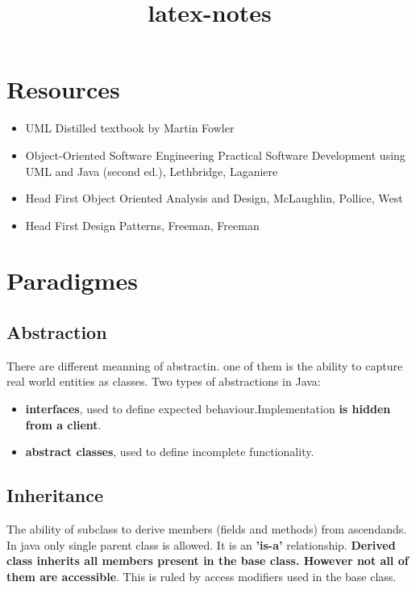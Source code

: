 \documentclass{report}
\title{latex-notes}
\begin{document}
\tableofcontents





\part{Resources}

\begin{itemize}
	\item UML Distilled textbook by Martin Fowler 
	\item Object-Oriented Software Engineering Practical Software Development
	using UML and Java (second ed.), Lethbridge, Laganiere
	\item Head First Object Oriented Analysis and Design, McLaughlin, Pollice, West
	\item Head First Design Patterns, Freeman, Freeman 
\end{itemize}




\part{Paradigmes}



\chapter{Abstraction}
There are different meanning of abstractin. one of them is the ability to capture real world entities as classes.
Two types of abstractions in Java:
\begin{itemize}
	\item \textbf{interfaces}, used to define expected behaviour.Implementation \textbf{is hidden from a client}.
	\item \textbf{abstract classes}, used to define incomplete functionality.
\end{itemize}



\chapter{Inheritance}
The ability of subclass to derive members (fields and methods) from ascendands. In java only single parent class is allowed. It is an \textbf{'is-a'} relationship.
\textbf{Derived class inherits all members present in the base class. 
However not all of them are accessible}. This is ruled by access modifiers used in the base class.
\end{document}
